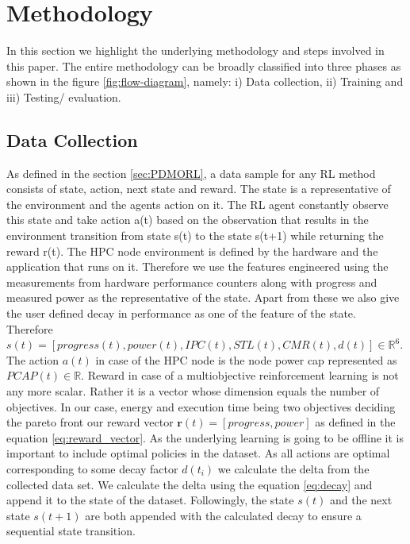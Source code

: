 \section{Methodology}
In this section we highlight the underlying methodology and steps involved in this paper. The entire methodology can be broadly classified into three phases as shown in the figure \ref{fig:flow-diagram}, namely: i) Data collection, ii) Training and iii) Testing/ evaluation.

\subsection{Data Collection}
As defined in the section \ref{sec:PDMORL}, a data sample for any RL method consists of state, action, next state and reward. The state is a representative of the environment and the agents action on it. The RL agent constantly observe this state and take action a(t) based on the observation that results in the environment transition from state s(t) to the state s(t+1) while returning the reward r(t). The HPC node environment is defined by the hardware and the application that runs on it. Therefore we use the features engineered using the measurements from hardware performance counters along with progress and measured power as the representative of the state. Apart from these we also give the user defined decay in performance as one of the feature of the state. Therefore $s(t) = [progress(t), power(t), IPC(t), STL(t), CMR(t), d(t)] \in \mathbb{R}^{6}$. The action $a(t)$ in case of the HPC node is the node power cap represented as $PCAP(t) \in \mathbb{R}$. Reward in case of a multiobjective reinforcement learning is not any more scalar. Rather it is a vector whose dimension equals the number of objectives. In our case, energy and execution time being two objectives deciding the pareto front our reward vector $\mathbf{r}(t) = [progress, power]$ as defined in the equation \ref{eq:reward_vector}. As the underlying learning is going to be offline it is important to include optimal policies in the dataset. As all actions are optimal corresponding to some decay factor $d(t_i)$ we calculate the delta from the collected data set. We calculate the delta using the equation \ref{eq:decay} and append it to the state of the dataset. Followingly, the state $s(t)$ and the next state $s(t+1)$ are both appended with the calculated decay to ensure a sequential state transition.  

